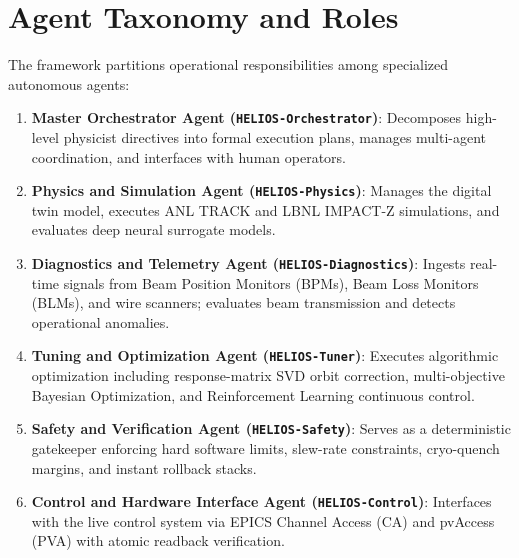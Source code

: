\documentclass[11pt,a4paper]{report}
\begin{document}
\section{Agent Taxonomy and Roles}
The framework partitions operational responsibilities among specialized autonomous agents:
\begin{enumerate}
    \item \textbf{Master Orchestrator Agent (\texttt{HELIOS-Orchestrator})}: Decomposes high-level physicist directives into formal execution plans, manages multi-agent coordination, and interfaces with human operators.
    \item \textbf{Physics and Simulation Agent (\texttt{HELIOS-Physics})}: Manages the digital twin model, executes ANL TRACK and LBNL IMPACT-Z simulations, and evaluates deep neural surrogate models.
    \item \textbf{Diagnostics and Telemetry Agent (\texttt{HELIOS-Diagnostics})}: Ingests real-time signals from Beam Position Monitors (BPMs), Beam Loss Monitors (BLMs), and wire scanners; evaluates beam transmission and detects operational anomalies.
    \item \textbf{Tuning and Optimization Agent (\texttt{HELIOS-Tuner})}: Executes algorithmic optimization including response-matrix SVD orbit correction, multi-objective Bayesian Optimization, and Reinforcement Learning continuous control.
    \item \textbf{Safety and Verification Agent (\texttt{HELIOS-Safety})}: Serves as a deterministic gatekeeper enforcing hard software limits, slew-rate constraints, cryo-quench margins, and instant rollback stacks.
    \item \textbf{Control and Hardware Interface Agent (\texttt{HELIOS-Control})}: Interfaces with the live control system via EPICS Channel Access (CA) and pvAccess (PVA) with atomic readback verification.
\end{enumerate}
\end{document}
